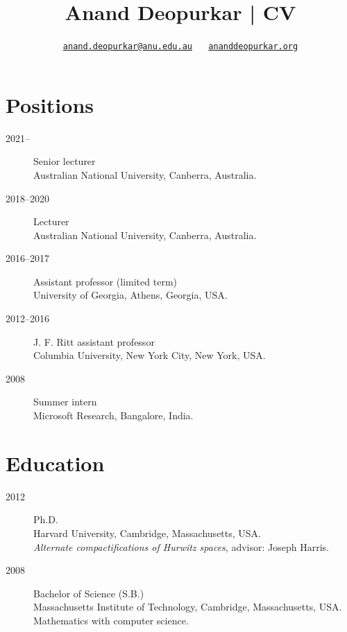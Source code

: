 \documentclass[11pt]{article}
\author{\href{mailto:anand.deopurkar@anu.edu.au}{\texttt{anand.deopurkar@anu.edu.au}} \(\quad\) \href{https://www.ananddeopurkar.org}{\texttt{ananddeopurkar.org}}}
\date{}
\title{Anand Deopurkar | CV}
\begin{document}
\maketitle
\section*{Positions}
\label{sec:org08a2c0d}
\label{org3c0ec3c}
\begin{description}
\item[{2021--}] Senior lecturer\\
Australian National University, Canberra, Australia.
\item[{2018--2020}] Lecturer\\
Australian National University, Canberra, Australia.
\item[{2016--2017}] Assistant professor (limited term)\\
University of Georgia, Athens, Georgia, USA.
\item[{2012--2016}] J. F. Ritt assistant professor\\
Columbia University, New York City, New York, USA.
\item[{2008}] Summer intern\\
Microsoft Research, Bangalore, India.
\end{description}
\section*{Education}
\label{sec:orga0f31ba}

\label{org2f1bfc9}
\begin{description}
\item[{2012}] Ph.D.\\
Harvard University, Cambridge, Massachusetts, USA.\\
      \emph{Alternate compactifications of Hurwitz spaces}, advisor: Joseph Harris.
\item[{2008}] Bachelor of Science (S.B.)\\
Massachusetts Institute of Technology, Cambridge, Massachusetts, USA.\\
      Mathematics with computer science.
\end{description}
\end{document}
